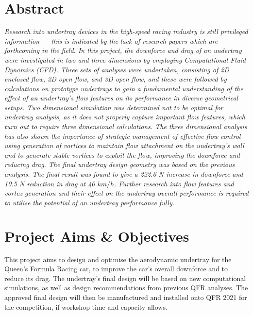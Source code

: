 \newpage
\thispagestyle{empty}
\section*{Abstract} 
\justifying

\textit{Research into undertray devices in the high-speed racing industry is still privileged information --- this is indicated by the lack of research papers which are forthcoming in the field. In this project, the downforce and drag of an undertray were investigated in two and three dimensions by employing Computational Fluid Dynamics (CFD). Three sets of analyses were undertaken, consisting of 2D enclosed flow, 2D open flow, and 3D open flow, and these were followed by calculations on prototype undertrays to gain a fundamental understanding of the effect of an undertray's flow features on its performance in diverse geometrical setups. Two dimensional simulation was determined not to be optimal for undertray analysis, as it does not properly capture important flow features, which turn out to require three dimensional calculations. The three dimensional analysis has also shown the importance of strategic management of effective flow control using generation of vortices to maintain flow attachment on the undertray's wall and to generate stable vortices to exploit the flow, improving the downforce and reducing drag. The final undertray design geometry was based on the previous analysis. The final result was found to give a 222.6 N increase in downforce and 10.5 N reduction in drag at 40 $km/h$. Further research into flow features and vortex generation and their effect on the undertray overall performance is required to utilise the potential of an undertray performance fully.}


\section*{Project Aims \& Objectives}
This project aims to design and optimise the aerodynamic undertray for the Queen's Formula Racing car, to improve the car's overall downforce and to reduce its drag. The undertray's final design will be based on new computational simulations, as well as design recommendations from previous QFR analyses. The approved final design will then be manufactured and installed onto QFR 2021 for the competition, if workshop time and capacity allows.

